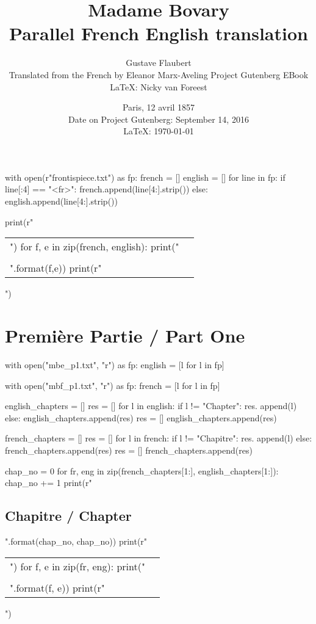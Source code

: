 \documentclass[a5paper]{book}
\title{Madame Bovary\\
Parallel French English translation}
\author{Gustave Flaubert \\
Translated from the French by Eleanor Marx-Aveling
Project Gutenberg EBook\\
\LaTeX: Nicky van Foreest
}
\date{Paris, 12 avril 1857\\ 
Date on Project Gutenberg: September 14, 2016\\
\LaTeX: \today}
\begin{document}
\maketitle

\frontmatter
\tableofcontents


\clearpage

\begin{pycode}
with open(r"frontispiece.txt") as fp:
    french = []
    english = []
    for line in fp:
        if line[:4] == "<fr>":
            french.append(line[4:].strip())
        else:
            english.append(line[4:].strip())

print(r"\begin{longtable}{PP}")
for f, e in zip(french, english):
    print("{} & {} \\\\".format(f,e))
print(r"\end{longtable}")
\end{pycode}

\mainmatter


\part*{Première Partie / Part One}
\begin{pycode}
with open("mbe_p1.txt", "r") as fp:
    english = [l for l in fp]

with open("mbf_p1.txt", "r") as fp:
    french = [l for l in fp]

english_chapters = []
res = []
for l in english:
    if l != "Chapter\n":
        res. append(l)
    else:
        english_chapters.append(res)
        res = []
english_chapters.append(res)

french_chapters = []
res = []
for l in french:
    if l != "Chapitre\n":
        res. append(l)
    else:
        french_chapters.append(res)
        res = []
french_chapters.append(res)

chap_no = 0
for fr, eng in zip(french_chapters[1:], english_chapters[1:]):
    chap_no += 1
    print(r"\chapter{{Chapitre {} / Chapter {}}}".format(chap_no, chap_no))
    print(r"\begin{longtable}{PP}")
    for f, e in zip(fr, eng):
        print("{} & {} \\\\".format(f, e))
    print(r"\end{longtable}")
\end{pycode}
\end{document}
